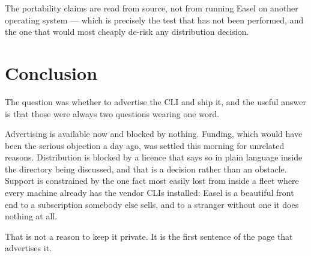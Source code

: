 \documentclass[10pt,letterpaper,twocolumn]{article}
\begin{document}
The portability claims are read from source, not from running Easel on another
operating system --- which is precisely the test that has not been performed,
and the one that would most cheaply de-risk any distribution decision.

\section{Conclusion}

The question was whether to advertise the CLI and ship it, and the useful answer
is that those were always two questions wearing one word.

Advertising is available now and blocked by nothing. Funding, which would have
been the serious objection a day ago, was settled this morning for unrelated
reasons. Distribution is blocked by a licence that says so in plain language
inside the directory being discussed, and that is a decision rather than an
obstacle. Support is constrained by the one fact most easily lost from inside a
fleet where every machine already has the vendor CLIs installed: Easel is a
beautiful front end to a subscription somebody else sells, and to a stranger
without one it does nothing at all.

That is not a reason to keep it private. It is the first sentence of the page
that advertises it.



\end{document}
